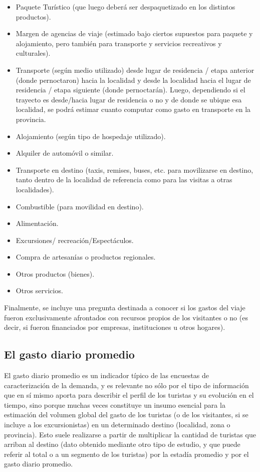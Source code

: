\documentclass[
]{book}
\begin{document}
\begin{itemize}
\item
  Paquete Turístico (que luego deberá ser despaquetizado en los distintos productos).
\item
  Margen de agencias de viaje (estimado bajo ciertos supuestos para paquete y alojamiento, pero también para transporte y servicios recreativos y culturales).
\item
  Transporte (según medio utilizado) desde lugar de residencia / etapa anterior (donde pernoctaron) hacia la localidad y desde la localidad hacia el lugar de residencia / etapa siguiente (donde pernoctarán). Luego, dependiendo si el trayecto es desde/hacia lugar de residencia o no y de donde se ubique esa localidad, se podrá estimar cuanto computar como gasto en transporte en la provincia.
\item
  Alojamiento (según tipo de hospedaje utilizado).
\item
  Alquiler de automóvil o similar.
\item
  Transporte en destino (taxis, remises, buses, etc. para movilizarse en destino, tanto dentro de la localidad de referencia como para las visitas a otras localidades).
\item
  Combustible (para movilidad en destino).
\item
  Alimentación.
\item
  Excursiones/ recreación/Espectáculos.
\item
  Compra de artesanías o productos regionales.
\item
  Otros productos (bienes).
\item
  Otros servicios.
\end{itemize}

Finalmente, se incluye una pregunta destinada a conocer si los gastos del viaje fueron exclusivamente afrontados con recursos propios de los visitantes o no (es decir, si fueron financiados por empresas, instituciones u otros hogares).

\hypertarget{el-gasto-diario-promedio}{%
\subsection{El gasto diario promedio}\label{el-gasto-diario-promedio}}

El gasto diario promedio es un indicador típico de las encuestas de caracterización de la demanda, y es relevante no sólo por el tipo de información que en sí mismo aporta para describir el perfil de los turistas y su evolución en el tiempo, sino porque muchas veces constituye un insumo esencial para la estimación del volumen global del gasto de los turistas (o de los visitantes, si se incluye a los excursionistas) en un determinado destino (localidad, zona o provincia). Esto suele realizarse a partir de multiplicar la cantidad de turistas que arriban al destino (dato obtenido mediante otro tipo de estudio, y que puede referir al total o a un segmento de los turistas) por la estadía promedio y por el gasto diario promedio.
\end{document}
